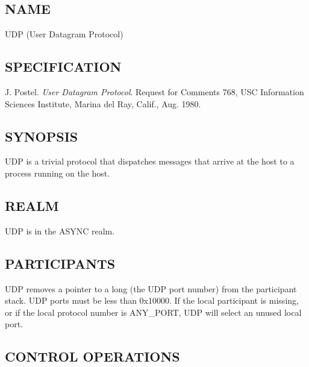 %
%
%

\subsection*{NAME}

\noindent UDP (User Datagram Protocol)

\subsection*{SPECIFICATION}

\noindent J. Postel. {\it User Datagram Protocol}. Request for Comments 
768, USC Information Sciences Institute, Marina del Ray, Calif., Aug. 1980.

\subsection*{SYNOPSIS}

\noindent UDP is a trivial protocol that dispatches messages that arrive 
at the host to a process running on the host.

\subsection*{REALM}

UDP is in the ASYNC realm.

\subsection*{PARTICIPANTS}

UDP removes a pointer to a long (the UDP port number) from the
participant stack.  UDP ports must be less than 0x10000.  
If the local participant is missing, or if the
local protocol number is ANY\_PORT, UDP will select an unused local
port. 


\subsection*{CONTROL OPERATIONS}

